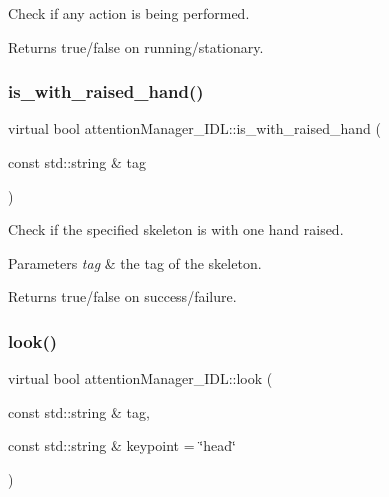 Check if any action is being performed. 

\begin{DoxyReturn}{Returns}
true/false on running/stationary. 
\end{DoxyReturn}
\mbox{\label{classattentionManager__IDL_aa6b2c971be0e878ab259675c83bba2dc}} 
\subsubsection{\texorpdfstring{is\_with\_raised\_hand()}{is\_with\_raised\_hand()}}
{\footnotesize\ttfamily virtual bool attention\+Manager\+\_\+\+I\+D\+L\+::is\+\_\+with\+\_\+raised\+\_\+hand (\begin{DoxyParamCaption}\item[{const std\+::string \&}]{tag }\end{DoxyParamCaption})\hspace{0.3cm}{\ttfamily [virtual]}}



Check if the specified skeleton is with one hand raised. 


\begin{DoxyParams}{Parameters}
{\em tag} & the tag of the skeleton. \\
\hline
\end{DoxyParams}
\begin{DoxyReturn}{Returns}
true/false on success/failure. 
\end{DoxyReturn}
\mbox{\label{classattentionManager__IDL_a42941cc508bb57aa390578ecdbfde7c2}} 
\subsubsection{\texorpdfstring{look()}{look()}}
{\footnotesize\ttfamily virtual bool attention\+Manager\+\_\+\+I\+D\+L\+::look (\begin{DoxyParamCaption}\item[{const std\+::string \&}]{tag,  }\item[{const std\+::string \&}]{keypoint = {\ttfamily \char`\"{}head\char`\"{}} }\end{DoxyParamCaption})\hspace{0.3cm}{\ttfamily [virtual]}}



